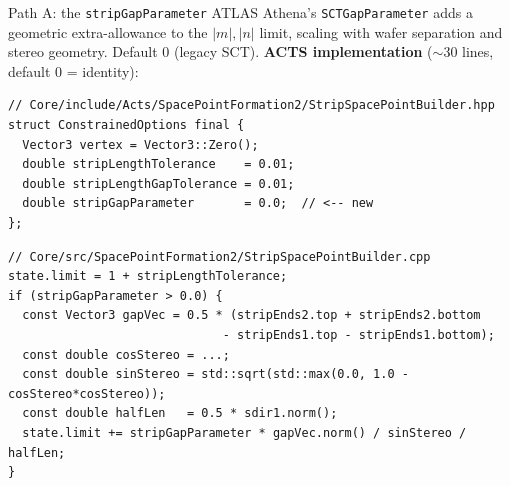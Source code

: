 \documentclass[aspectratio=169,10pt]{beamer}
\begin{document}
\begin{frame}[fragile]{Path A: the \texttt{stripGapParameter}}
\footnotesize
ATLAS Athena's \texttt{SCTGapParameter} adds a geometric extra-allowance to the $|m|, |n|$ limit, scaling with wafer separation and stereo geometry. Default 0 (legacy SCT). \textbf{ACTS implementation} ($\sim$30 lines, default 0 = identity):

\begin{lstlisting}
// Core/include/Acts/SpacePointFormation2/StripSpacePointBuilder.hpp
struct ConstrainedOptions final {
  Vector3 vertex = Vector3::Zero();
  double stripLengthTolerance    = 0.01;
  double stripLengthGapTolerance = 0.01;
  double stripGapParameter       = 0.0;  // <-- new
};
\end{lstlisting}

\begin{lstlisting}
// Core/src/SpacePointFormation2/StripSpacePointBuilder.cpp
state.limit = 1 + stripLengthTolerance;
if (stripGapParameter > 0.0) {
  const Vector3 gapVec = 0.5 * (stripEnds2.top + stripEnds2.bottom
                              - stripEnds1.top - stripEnds1.bottom);
  const double cosStereo = ...;
  const double sinStereo = std::sqrt(std::max(0.0, 1.0 - cosStereo*cosStereo));
  const double halfLen   = 0.5 * sdir1.norm();
  state.limit += stripGapParameter * gapVec.norm() / sinStereo / halfLen;
}
\end{lstlisting}
\end{frame}
\end{document}

